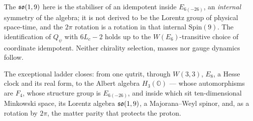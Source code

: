 \begin{center}
\end{center}

\begin{boundary}
The $\mathfrak{so}(1,9)$ here is the stabiliser of an idempotent inside $E_{6(-26)}$, an
\emph{internal} symmetry of the algebra; it is not derived to be the Lorentz group of
physical space-time, and the $2\pi$ rotation is a rotation in that internal $\mathrm{Spin}(9)$.
The identification of $Q_\psi$ with $6L_c-2$ holds up to the $W(E_6)$-transitive choice of
coordinate idempotent. Neither chirality selection, masses nor gauge dynamics follow.
\end{boundary}

\begin{keyidea}
The exceptional ladder closes: from one qutrit, through $W(3,3)$, $E_8$, a Hesse clock and
its real form, to the Albert algebra $H_3(\mathbb O)$ --- whose automorphisms are $F_4$,
whose structure group is $E_{6(-26)}$, and inside which sit ten-dimensional Minkowski space,
its Lorentz algebra $\mathfrak{so}(1,9)$, a Majorana--Weyl spinor, and, as a rotation by $2\pi$, the
matter parity that protects the proton.
\end{keyidea}
